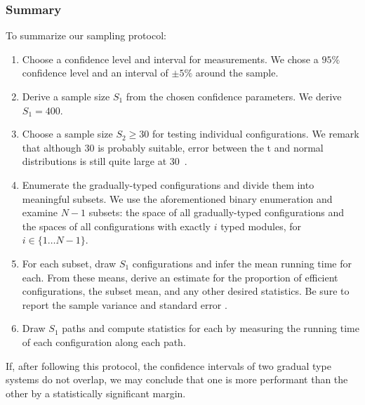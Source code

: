 \documentclass{article}
\begin{document}
\subsubsection{Summary}
To summarize our sampling protocol:
\begin{enumerate}
\item Choose a confidence level and interval for measurements.
  We chose a $95\%$ confidence level and an interval of $\pm 5\%$ around the sample.
\item Derive a sample size $S_1$ from the chosen confidence parameters.
  We derive $S_1 = 400$.
\item Choose a sample size $S_2 \ge 30$ for testing individual configurations.
  We remark that although 30 is probably suitable, error between the t and normal distributions is still quite large at 30~\cite{todo}.
\item Enumerate the gradually-typed configurations and divide them into meaningful subsets.
  We use the aforementioned binary enumeration and examine $N-1$ subsets: the space of all gradually-typed configurations and the spaces of all configurations with exactly $i$ typed modules, for $i \in \{1 \ldots N-1\}$.
\item For each subset, draw $S_1$ configurations and infer the mean running time for each.
  From these means, derive an estimate for the proportion of efficient configurations, the subset mean, and any other desired statistics.
  Be sure to report the sample variance and standard error .
\item Draw $S_1$ paths and compute statistics for each by measuring the running time of each configuration along each path.
\end{enumerate}
If, after following this protocol, the confidence intervals of two gradual type systems do not overlap, we may conclude that one is more performant than the other by a statistically significant margin.


\end{document}

